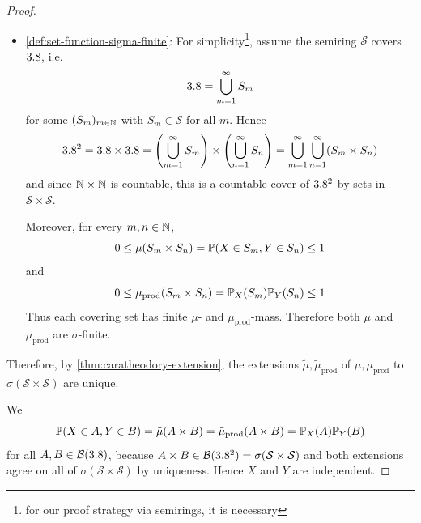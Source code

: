 \begin{proof}
\begin{itemize}
For \(\mu_{\text{prod}}\), we again use
\(
\nu \coloneq \Prob_X \otimes \Prob_Y
\).
Since \(\nu\) is a measure and \(\mu_{\text{prod}}=\nu\) on rectangles in \(\mathcal{S}\times\mathcal{S}\), we obtain
\[
\begin{aligned}
\mu_{\text{prod}}(A \times B)
&=
\nu(A \times B) \\
&\overset{\text{\eqref{eq:subset-measure}}}{\leq}
\nu\left(\bigcup_{k=1}^{\infty} (A_k \times B_k)\right) \\
&\overset{\text{\eqref{eq:countable-subadditivity}}}{\leq}
\sum_{k=1}^{\infty} \nu(A_k \times B_k) \\
&=
\sum_{k=1}^{\infty} \mu_{\text{prod}}(A_k \times B_k)
\end{aligned}
\]
Thus \(\mu_{\text{prod}}\) is \(\sigma\)-subadditive as well. \cmark

\item
\ref{def:set-function-sigma-finite}:
For simplicity\footnote{%
for our proof strategy via semirings, it is necessary%
}, assume the semiring \(\mathcal{S}\) covers \(3.8\), i.e.
\[
3.8 = \bigcup_{m=1}^{\infty} S_m
\]
for some $(S_m)_{m \in \mathbb{N}}$ with $S_m \in \mathcal{S}$ for all $m$.
Hence
\[
\R^2
=
\R \times \R
=
\left(\bigcup_{m=1}^{\infty} S_m\right) \times \left(\bigcup_{n=1}^{\infty} S_n\right)
= %
\bigcup_{m=1}^{\infty} \bigcup_{n=1}^{\infty} (S_m \times S_n)
\]
and since \(\mathbb{N} \times \mathbb{N}\) is countable, this is a countable cover of \(3.8^2\) by sets in
\(\mathcal{S} \times \mathcal{S}\).

Moreover, for every \(m,n \in \mathbb{N}\),
\[
0 \leq \mu(S_m \times S_n)
=
\mathbb{P}(X \in S_m, Y \in S_n)
\leq 1
\]
and
\[
0 \leq \mu_{\text{prod}}(S_m \times S_n)
=
\mathbb{P}_X(S_m)\mathbb{P}_Y(S_n)
\leq 1
\]
Thus each covering set has finite \(\mu\)- and \(\mu_{\text{prod}}\)-mass.
Therefore both \(\mu\) and \(\mu_{\text{prod}}\) are \(\sigma\)-finite. \cmark
\end{itemize}
Therefore, 
by \autoref{thm:caratheodory-extension},
the extensions $\tilde{\mu}, \tilde{\mu}_{\text{prod}}$ of ${\mu}, {\mu}_{\text{prod}}$ to $\sigma(\mathcal{S} \times \mathcal{S})$ are unique.



We 
\[
\mathbb{P}(X \in A, Y \in B)
=
\tilde{\mu}(A \times B)
=
\tilde{\mu}_{\text{prod}}(A \times B)
=
\mathbb{P}_X(A)\mathbb{P}_Y(B)
\]
for all $A, B \in \mathcal{B}(3.8)$, because $A \times B \in \mathcal{B}(3.8^2)=\sigma(\mathcal{S} \times \mathcal{S})$ and both extensions agree on all of $\sigma(\mathcal{S} \times \mathcal{S})$ by uniqueness. 
Hence $X$ and $Y$ are independent.
\end{proof}

